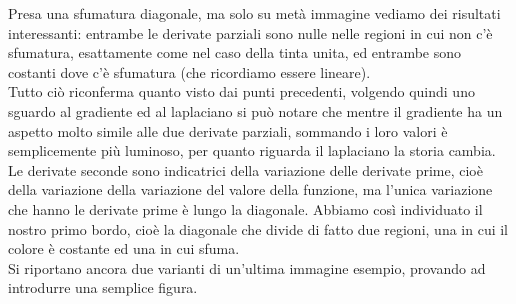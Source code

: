 Presa una sfumatura diagonale, ma solo su metà immagine vediamo dei risultati interessanti: entrambe le derivate parziali sono nulle nelle regioni in cui non c'è sfumatura, esattamente come nel caso della tinta unita, ed entrambe sono costanti dove c'è sfumatura (che ricordiamo essere lineare).\\
Tutto ciò riconferma quanto visto dai punti precedenti, volgendo quindi uno sguardo al gradiente ed al laplaciano si può notare che mentre il gradiente ha un aspetto molto simile alle due derivate parziali, sommando i loro valori è semplicemente più luminoso, per quanto riguarda il laplaciano la storia cambia. Le derivate seconde sono indicatrici della variazione delle derivate prime, cioè della variazione della variazione del valore della funzione, ma l'unica variazione che hanno le derivate prime è lungo la diagonale.
Abbiamo così individuato il nostro primo bordo, cioè la diagonale che divide di fatto due regioni, una in cui il colore è costante ed una in cui sfuma.\\

\vspace{1em}
Si riportano ancora due varianti di un'ultima immagine esempio, provando ad introdurre una semplice figura.\\

\newpage
